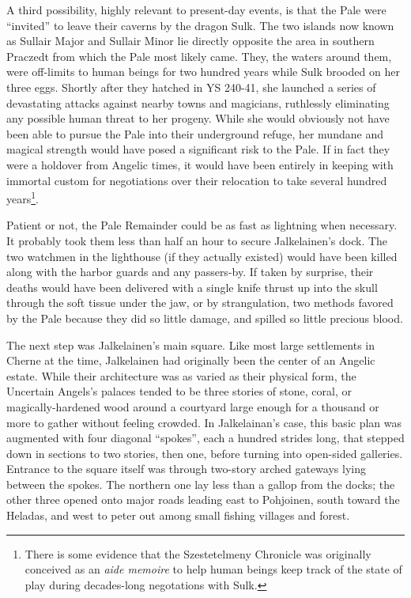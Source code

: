 \documentclass[12pt]{report}
\begin{document}
A third possibility, highly relevant to present-day events, is that
the Pale were ``invited'' to leave their caverns by the dragon Sulk.
The two islands now known as Sullair Major and Sullair Minor lie
directly opposite the area in southern Praczedt from which the Pale
most likely came.  They, the waters around them, were off-limits to
human beings for two hundred years while Sulk brooded on her three
eggs.  Shortly after they hatched in YS 240-41, she launched a series
of devastating attacks against nearby towns and magicians, ruthlessly
eliminating any possible human threat to her progeny.  While she would
obviously not have been able to pursue the Pale into their underground
refuge, her mundane and magical strength would have posed a
significant risk to the Pale.  If in fact they were a holdover from
Angelic times, it would have been entirely in keeping with immortal
custom for negotiations over their relocation to take several hundred
years\footnote{There is some evidence that the Szestetelmeny Chronicle
was originally conceived as an \emph{aide memoire} to help human
beings keep track of the state of play during decades-long negotations
with Sulk.}.

Patient or not, the Pale Remainder could be as fast as lightning when
necessary.  It probably took them less than half an hour to secure
Jalkelainen's dock.  The two watchmen in the lighthouse (if they
actually existed) would have been killed along with the harbor guards
and any passers-by.  If taken by surprise, their deaths would have
been delivered with a single knife thrust up into the skull through
the soft tissue under the jaw, or by strangulation, two methods
favored by the Pale because they did so little damage, and spilled so
little precious blood.

The next step was Jalkelainen's main square.  Like most large
settlements in Cherne at the time, Jalkelainen had originally been the
center of an Angelic estate.  While their architecture was as varied
as their physical form, the Uncertain Angels's palaces tended to be
three stories of stone, coral, or magically-hardened wood around a
courtyard large enough for a thousand or more to gather without
feeling crowded.  In Jalkelainan's case, this basic plan was augmented
with four diagonal ``spokes'', each a hundred strides long, that stepped
down in sections to two stories, then one, before turning into
open-sided galleries.  Entrance to the square itself was through
two-story arched gateways lying between the spokes.  The northern one
lay less than a gallop from the docks; the other three opened onto
major roads leading east to Pohjoinen, south toward the Heladas, and
west to peter out among small fishing villages and forest.
\end{document}

